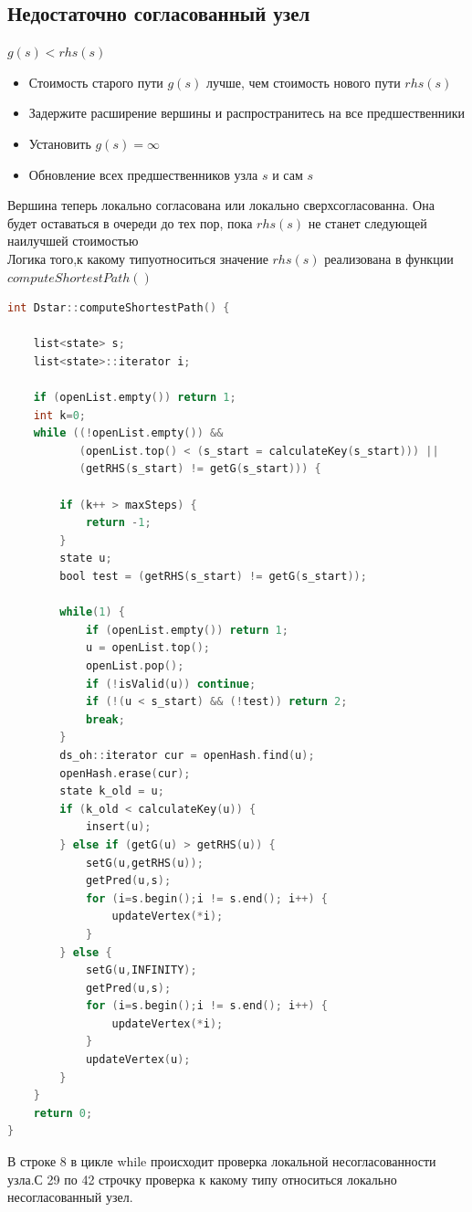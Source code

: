 \documentclass[12pt]{article}
\begin{document}
\subsection*{Недостаточно согласованный узел}
\begin{center}
          $g(s)<rhs(s)$
\end{center}
\begin{itemize}
    \item Стоимость старого пути $g(s)$ лучше, чем стоимость нового пути $rhs(s)$
    \item Задержите расширение вершины и распространитесь на все предшественники
    \item Установить $g(s) = \infty$
    \item Обновление всех предшественников узла $s$ и сам $s$
\end{itemize}
Вершина теперь локально согласована или локально сверхсогласованна. Она будет оставаться в
очереди до тех пор, пока $rhs(s)$ не станет следующей наилучшей стоимостью\\
Логика того,к какому типуотноситься значение $rhs(s)$ реализована в функции $computeShortestPath()$
\begin{lstlisting}[language=C,style=C]
int Dstar::computeShortestPath() {

    list<state> s;
    list<state>::iterator i;

    if (openList.empty()) return 1;
    int k=0;
    while ((!openList.empty()) &&
           (openList.top() < (s_start = calculateKey(s_start))) ||
           (getRHS(s_start) != getG(s_start))) {

        if (k++ > maxSteps) {
            return -1;
        }
        state u;
        bool test = (getRHS(s_start) != getG(s_start));

        while(1) {
            if (openList.empty()) return 1;
            u = openList.top();
            openList.pop();
            if (!isValid(u)) continue;
            if (!(u < s_start) && (!test)) return 2;
            break;
        }
        ds_oh::iterator cur = openHash.find(u);
        openHash.erase(cur);
        state k_old = u;
        if (k_old < calculateKey(u)) { 
            insert(u);
        } else if (getG(u) > getRHS(u)) { 
            setG(u,getRHS(u));
            getPred(u,s);
            for (i=s.begin();i != s.end(); i++) {
                updateVertex(*i);
            }
        } else {   
            setG(u,INFINITY);
            getPred(u,s);
            for (i=s.begin();i != s.end(); i++) {
                updateVertex(*i);
            }
            updateVertex(u);
        }
    }
    return 0;
}
\end{lstlisting}
В строке 8 в цикле while происходит проверка локальной несогласованности узла.С 29 по 42 строчку проверка к какому типу относиться локально несогласованный узел.
\end{document}
